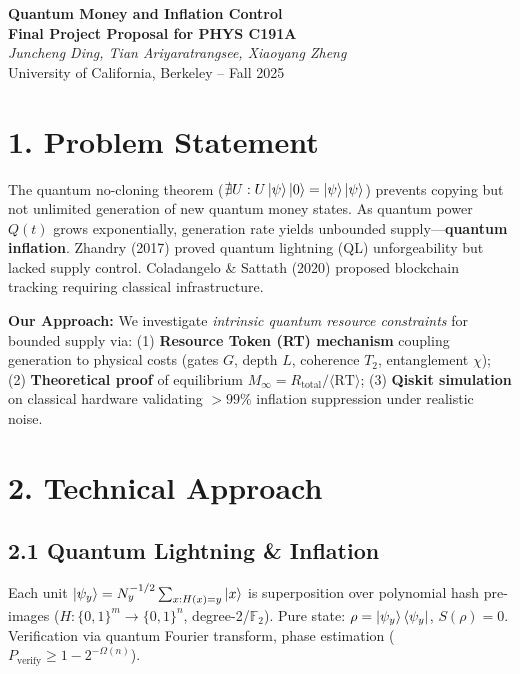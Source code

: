 \documentclass[a4paper,10pt,twoside]{article}
\begin{document}
\begin{center}
{\large \textbf{Quantum Money and Inflation Control}} \\[2pt]
\textbf{Final Project Proposal for PHYS C191A}\\[1pt]
\textit{Juncheng Ding, Tian Ariyaratrangsee, Xiaoyang Zheng}\\[1pt]
University of California, Berkeley – Fall 2025
\end{center}

\vspace{-6pt}
\section*{1. Problem Statement}
\vspace{-3pt}

The quantum no-cloning theorem ($\nexists U: U\ket{\psi}\ket{0} = \ket{\psi}\ket{\psi}$) prevents copying but not unlimited generation of new quantum money states. As quantum power $Q(t)$ grows exponentially, generation rate yields unbounded supply—\textbf{quantum inflation}. Zhandry (2017) proved quantum lightning (QL) unforgeability but lacked supply control. Coladangelo \& Sattath (2020) proposed blockchain tracking requiring classical infrastructure.

\textbf{Our Approach:} We investigate \textit{intrinsic quantum resource constraints} for bounded supply via: (1) \textbf{Resource Token (RT) mechanism} coupling generation to physical costs (gates $G$, depth $L$, coherence $T_2$, entanglement $\chi$); (2) \textbf{Theoretical proof} of equilibrium $M_{\infty} = R_{\text{total}}/\langle\text{RT}\rangle$; (3) \textbf{Qiskit simulation} on classical hardware validating $>99\%$ inflation suppression under realistic noise.

\vspace{-3pt}
\section*{2. Technical Approach}
\vspace{-5pt}

\subsection*{2.1 Quantum Lightning \& Inflation}
\vspace{-3pt}

Each unit $\ket{\psi_y} = N_y^{-1/2}\sum_{x: H(x)=y} \ket{x}$ is superposition over polynomial hash pre-images ($H: \{0,1\}^m \to \{0,1\}^n$, degree-2/$\mathbb{F}_2$). Pure state: $\rho = \ket{\psi_y}\bra{\psi_y}$, $S(\rho) = 0$. Verification via quantum Fourier transform, phase estimation ($P_{\text{verify}} \geq 1-2^{-\Omega(n)}$).
\end{document}

